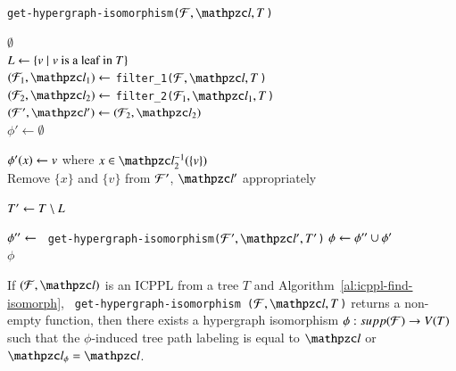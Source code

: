 \documentclass[MS,]{iitmdiss}
\begin{document}
\begin{algorithm}[h]
  \caption{{\tt get-hypergraph-isomorphism($\cF, \cl, T$)}}
  \label{al:icppl-find-isomorph}
  \begin{algorithmic}[\lndisplay]

    \RETURN $\emptyset$\\
    \ENDIF
    \STATE $L \leftarrow \{v \mid v \text{ is a leaf in }      T\}$\\
    \STATE $(\cF_1, \cl_1) \assign$ {\tt filter\_1($\cF, \cl,
      T$)}\\
    \STATE $(\cF_2, \cl_2) \assign$ {\tt filter\_2($\cF_1,
      \cl_1, T$)}\\

    \STATE $(\cF', \cl') \assign (\cF_2, \cl_2)$\\
    \STATE $\phi' \leftarrow \emptyset$

    \STATE $\phi'(x) \leftarrow v$ where $x \in \cl_2^{-1}(\{v\})$
    \\
    \STATE Remove $\{x\}$ and $\{v\}$ from ${\cal F}'$, $\cl'$  appropriately\\
    \ENDFOR

    \STATE $T' \leftarrow T \setminus L$

    \STATE $\phi'' \leftarrow$ {\tt
      get-hypergraph-isomorphism($\cF', \cl', T'$)}
    \STATE $\phi \leftarrow \phi'' \cup \phi'$ \\
    \RETURN $\phi$
  \end{algorithmic}
\end{algorithm}

\begin{lemma}
  \label{lem:hyperiso}  %
  If $(\cF, \cl)$ is an ICPPL from a tree $T$ and
  Algorithm~\ref{al:icppl-find-isomorph}, {\tt
    get-hypergraph-isomorphism ($\cF, \cl, T$)} returns a non-empty
  function, then there exists a hypergraph isomorphism $\phi :
  supp({\cal F}) \rightarrow V(T)$ such that the $\phi$-induced tree path
  labeling is equal to $\cl$ or $\cl_\phi = \cl$.
\end{lemma}
\end{document}
